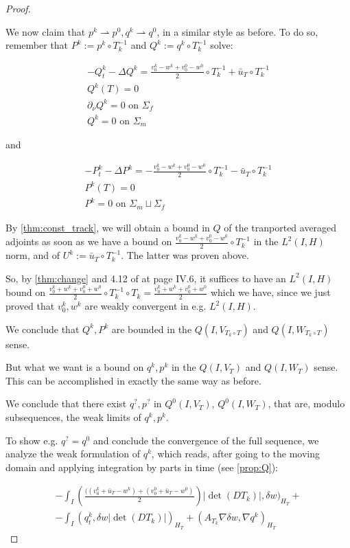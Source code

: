 \documentclass[english,a4paper,10pt,oneside]{scrbook}	%
\theoremstyle{break}
\newenvironment{mproof}[1][\proofname]{%
  \begin{proof}[#1]$ $\par\nobreak\ignorespaces
}{%
  \end{proof}
}
\renewcommand*{\proofname}{Proof}
\theoremstyle{remark}
\newcommand{\ds}{\displaystyle}
\newcommand{\weakc}{\rightharpoonup}
\begin{document}
\begin{mproof}
We now claim that $p^k \weakc p^0, q^k\weakc q^0$, in a similar style as before. To do so, remember that $P^k:=p^k\circ T_k^{-1}$ and $Q^k:=q^k\circ T_k^{-1}$ solve:

\begin{align*}
-Q^k_t-\Delta Q^k =\frac{v_0^k-w^k+v_0^0-w^0}{2}\circ T_k^{-1}+\bar{u}_T\circ T_k^{-1} \\
Q^k(T)=0\\
\partial_\nu Q^k = 0 \text{ on } \Sigma_f\\
Q^k = 0 \text{ on } \Sigma_m
\end{align*}

and

\begin{align*}
-P^k_t-\Delta P^k =-\frac{v_0^k-w^k+v_0^0-w^0}{2}\circ T_k^{-1}-\bar{u}_T\circ T_k^{-1} \\
P^k(T)=0\\
P^k = 0 \text{ on } \Sigma_m \sqcup \Sigma_f
\end{align*}

By \cref{thm:const_track}, we will obtain a bound in $Q$ of the tranported averaged adjoints as soon as we have a bound on $\ds \frac{v_0^k-w^k+v_0^0-w^0}{2}\circ T_k^{-1}$ in the $L^2(I,H)$ norm, and of $U^k:=\bar{u}_T\circ T_k^{-1}$. The latter was proven above.

So, by \cref{thm:change} and 4.12 of \cite{murat} at page IV.6, it suffices to have an $L^2(I,H)$ bound on $\ds \frac{v_0^k+w^k+v_0^0+w^0}{2}\circ T_k^{-1}\circ T_k = \frac{v_0^k+w^k+v_0^0+w^0}{2}$ which we have, since we just proved that $v_0^k, w^k$ are weakly convergent in e.g. $L^2(I,H)$.

We conclude that $Q^k,P^k$ are bounded in the $Q(I,V_{T_k\circ T})$ and $Q(I,W_{T_k\circ T})$ sense.

But what we want is a bound on $q^k, p^k$ in the $Q(I,V_{ T})$ and $Q(I,W_{ T})$ sense. This can be accomplished in exactly the same way as before.

We conclude that there exist $q^?, p^?$ in $Q^0(I,V_{ T})$, $Q^0(I,W_{ T})$, that are, modulo subsequences, the weak limits of $q^k, p^k$.

To show e.g. $q^?=q^0$ and conclude the convergence of the full sequence, we analyze the weak formulation of $q^k$, which reads, after going to the moving domain and applying integration by parts in time (see \ref{prop:Q}):

\begin{align*}
-\int_I \left (\frac{((v_0^k+\bar{u}_T - w^k)+(v_0^0+\bar{u}_T - w^0)}{2}\right )|\det(DT_k)|,\delta w)_{H_T}+\\
-\int_I (  q^k_t ,   \delta w |\det(DT_k)|)_{H_T}+ (A_{T_k}\nabla \delta w, \nabla q^k)_{H_T}
\end{align*}


\end{mproof}
\end{document}
